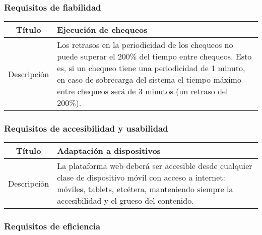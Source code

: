 \FloatBarrier
\subsubsection{Requisitos de fiabilidad}


\begin{center}
  
  \begin{tabularx}{\textwidth}{|c|X|}
    \hline
    Título & Ejecución de chequeos \\

    \hline

    Descripción & Los retrasos en la periodicidad de los chequeos no puede
    superar el 200\% del tiempo entre chequeos. Esto es, si un chequeo tiene una
    periodicidad de 1 minuto, en caso de sobrecarga del sistema el tiempo máximo
    entre chequeos será de 3 minutos (un retraso del 200\%). \\

    \hline
  \end{tabularx}
\end{center}


\FloatBarrier
\subsubsection{Requisitos de accesibilidad y usabilidad}

\begin{center}
  
  \begin{tabularx}{\textwidth}{|c|X|}
    \hline
    Título & Adaptación a dispositivos \\

    \hline

    Descripción & La plataforma web deberá ser accesible desde cualquier clase
    de dispositivo móvil con acceso a internet: móviles, tablets, etcétera,
    manteniendo siempre la accesibilidad y el grueso del contenido. \\

    \hline
  \end{tabularx}
  \label{tab:accesibilidad}
\end{center}


\FloatBarrier
\subsubsection{Requisitos de eficiencia}

